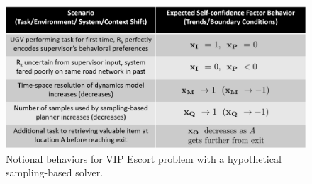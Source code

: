 
\begin{figure}[tbp]
    \centering
    \includegraphics[width=0.99\linewidth]{Figures/scTrendsBoundaryExample.png}
    \caption{Notional \famsec{} behaviors for VIP Escort problem with a hypothetical sampling-based solver.}
    \label{fig:trendsBCs}
\end{figure}

